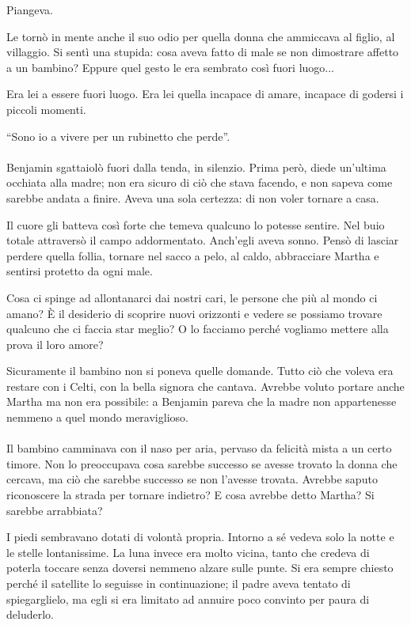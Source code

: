 \documentclass[a4paper,12pt]{book}
\begin{document}
Piangeva.

Le tornò in mente anche il suo odio per quella donna che ammiccava al figlio,
al villaggio. Si sentì una stupida: cosa aveva fatto di male se non dimostrare
affetto a un bambino? Eppure quel gesto le era sembrato così fuori luogo...

Era lei a essere fuori luogo. Era lei quella incapace di amare, incapace di
godersi i piccoli momenti.

``Sono io a vivere per un rubinetto che perde''.
\paragraph{}
Benjamin sgattaiolò fuori dalla tenda, in silenzio. Prima però, diede
un'ultima occhiata alla madre; non era sicuro di ciò che stava facendo, e non
sapeva come sarebbe andata a finire. Aveva una sola certezza: di non voler
tornare a casa.

Il cuore gli batteva così forte che temeva qualcuno lo potesse sentire. Nel
buio totale attraversò il campo addormentato. Anch'egli aveva sonno. Pensò di
lasciar perdere quella follia, tornare nel sacco a pelo, al caldo, abbracciare
Martha e sentirsi protetto da ogni male.

Cosa ci spinge ad allontanarci dai nostri cari, le persone che più al mondo ci
amano? È il desiderio di scoprire nuovi orizzonti e vedere se possiamo trovare
qualcuno che ci faccia star meglio? O lo facciamo perché vogliamo mettere alla
prova il loro amore?

Sicuramente il bambino non si poneva quelle domande. Tutto ciò che voleva era
restare con i Celti, con la bella signora che cantava. Avrebbe voluto portare
anche Martha ma non era possibile: a Benjamin pareva che la madre non
appartenesse nemmeno a quel mondo meraviglioso.

\paragraph{}
Il bambino camminava con il naso per aria, pervaso da felicità mista a un certo
timore. Non lo preoccupava cosa sarebbe successo se avesse trovato la donna che
cercava, ma ciò che sarebbe successo se non l'avesse trovata. Avrebbe saputo
riconoscere la strada per tornare indietro? E cosa avrebbe detto Martha? Si
sarebbe arrabbiata?

I piedi sembravano dotati di volontà propria. Intorno a sé vedeva solo la
notte e le stelle lontanissime. La luna invece era molto vicina, tanto che
credeva di poterla toccare senza doversi nemmeno alzare sulle punte. Si era
sempre chiesto perché il satellite lo seguisse in continuazione; il padre aveva
tentato di spiegarglielo, ma egli si era limitato ad annuire poco convinto per
paura di deluderlo.
\end{document}
